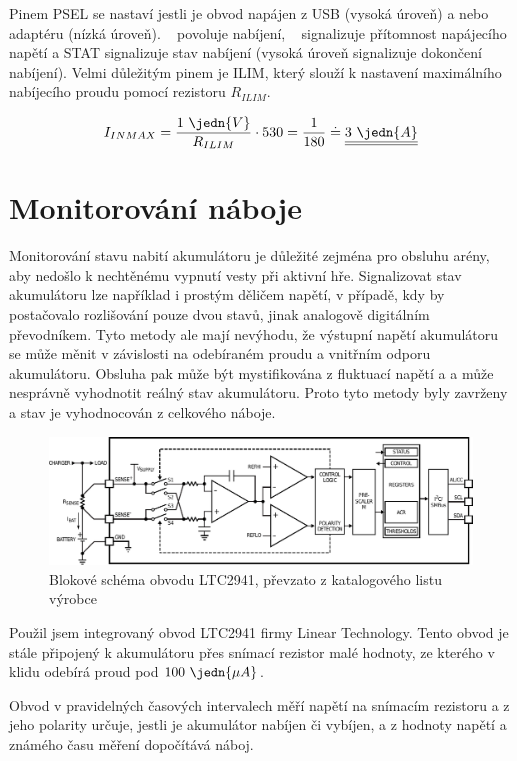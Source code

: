 Pinem PSEL se nastaví jestli je obvod napájen z USB (vysoká úroveň) a nebo adaptéru (nízká úroveň). ~ povoluje nabíjení, ~ signalizuje přítomnost napájecího napětí a STAT signalizuje stav nabíjení (vysoká úroveň signalizuje dokončení nabíjení). Velmi důležitým pinem je ILIM, který slouží k nastavení maximálního nabíjecího proudu pomocí rezistoru $R_{ILIM}$.

$$I_{IN MAX} = \dfrac{1~\jedn{V}}{R_{ILIM}} \cdot 530 = \dfrac{1}{180} \doteq \underline{\underline{3~\jedn{A}}}$$ \nonumber

\section{Monitorování náboje}
Monitorování stavu nabití akumulátoru je důležité zejména pro obsluhu arény, aby nedošlo k nechtěnému vypnutí vesty při aktivní hře. Signalizovat stav akumulátoru lze například i prostým děličem napětí, v případě, kdy by postačovalo rozlišování pouze dvou stavů, jinak analogově digitálním převodníkem. Tyto metody ale mají nevýhodu, že výstupní napětí akumulátoru se může měnit v závislosti na odebíraném proudu a vnitřním odporu akumulátoru. Obsluha pak může být mystifikována z fluktuací napětí a a může nesprávně vyhodnotit reálný stav akumulátoru. Proto tyto metody byly zavrženy a stav je vyhodnocován z celkového náboje.

\begin{figure}[H]
    \begin{center}
        \includegraphics[width=\textwidth]{img/LTC2941-block}
    \end{center}
    \caption{Blokové schéma obvodu LTC2941, převzato z katalogového listu výrobce}
\end{figure}
Použil jsem integrovaný obvod LTC2941 firmy Linear Technology. Tento obvod je stále připojený k akumulátoru přes snímací rezistor malé hodnoty, ze kterého v klidu odebírá proud pod $100~\jedn{\mu A}$.

Obvod v pravidelných časových intervalech měří napětí na snímacím rezistoru a z jeho polarity určuje, jestli je akumulátor nabíjen či vybíjen, a z hodnoty napětí a známého času měření dopočítává náboj.

